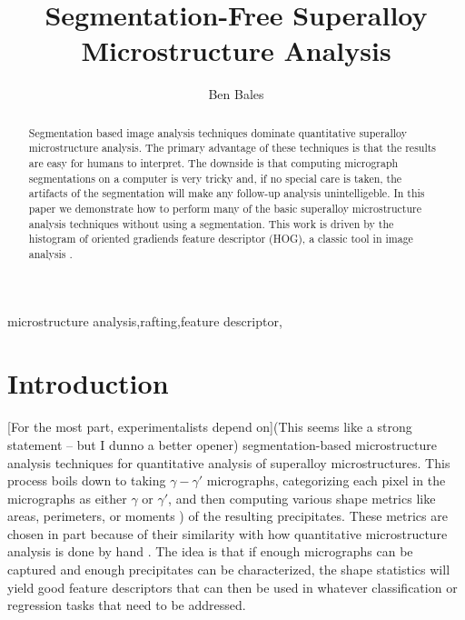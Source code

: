 \documentclass[review]{elsarticle}
\date{}
\begin{document}
	\begin{frontmatter}
		\title{Segmentation-Free Superalloy Microstructure Analysis}

		\author{Ben Bales}
		\address{University of California, Department of Mechanical Engineering, Santa Barbara, CA 93106-5070}

		\begin{abstract}
			Segmentation based image analysis techniques dominate quantitative superalloy microstructure analysis. The primary advantage of these techniques is that the results are easy for humans to interpret. The downside is that computing micrograph segmentations on a computer is very tricky and, if no special care is taken, the artifacts of the segmentation will make any follow-up analysis unintelligeble. In this paper we demonstrate how to perform many of the basic superalloy microstructure analysis techniques without using a segmentation. This work is driven by the histogram of oriented gradiends feature descriptor (HOG), a classic tool in image analysis \cite{gradtex, hog, girsh}.
		\end{abstract}

		\begin{keyword}
			microstructure analysis\sep rafting\sep feature descriptor\sep 
		\end{keyword}
	\end{frontmatter}

	\section{Introduction}
		[For the most part, experimentalists depend on](This seems like a strong statement -- but I dunno a better opener) segmentation-based microstructure analysis techniques for quantitative analysis of superalloy microstructures. This process boils down to taking $\gamma-\gamma'$ micrographs, categorizing each pixel in the micrographs as either $\gamma$ or $\gamma'$, and then computing various shape metrics like areas, perimeters, or moments \cite{twoDM, threeDM}) of the resulting precipitates. These metrics are chosen in part because of their similarity with how quantitative microstructure analysis is done by hand \cite{sluytman, underwood}. The idea is that if enough micrographs can be captured and enough precipitates can be characterized, the shape statistics will yield good feature descriptors that can then be used in whatever classification or regression tasks that need to be addressed.
\end{document}
